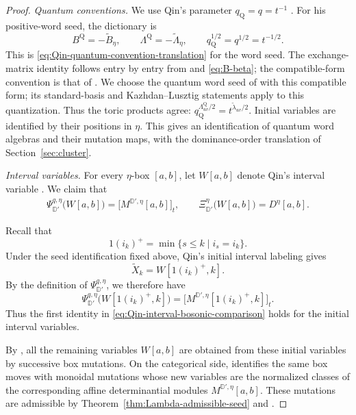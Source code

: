 \documentclass[12pt, reqno]{amsart}
\theoremstyle{plain}
\theoremstyle{definition}
\numberwithin{equation}{section}
\newcommand{\DD}{\mathbb{D}}
\begin{document}
\begin{proof}
\noindent\emph{Quantum conventions.}
We use Qin's parameter \(q_{\mathrm Q}=q=t^{-1}\)
\cite{qin2024analogs}. For his positive-word seed, the dictionary is
\begin{equation}\label{eq:Qin-word-quantum-dictionary}
 B^{\mathrm Q}=-\widetilde B_\eta,
 \qquad
 \Lambda^{\mathrm Q}=-\widetilde\Lambda_\eta,
 \qquad q_{\mathrm Q}^{1/2}=q^{1/2}=t^{-1/2}.
\end{equation}
This is \eqref{eq:Qin-quantum-convention-translation} for the word
seed.  The exchange-matrix identity follows entry by entry from
\cite[Lemma~6.3]{qin2024analogs} and \eqref{eq:B-beta}; the
compatible-form convention is that of
\cite[Section~4.1]{qin2024analogs}.  We choose the quantum word
seed of \cite[Section~6.2]{qin2024analogs} with this compatible
form; its standard-basis and Kazhdan--Lusztig statements apply to
this quantization.  Thus the toric products agree:
\(q_{\mathrm Q}^{\Lambda^{\mathrm Q}_{uv}/2}
 =t^{\widetilde\lambda_{uv}/2}\).
Initial variables are identified by their positions in \(\eta\).
This gives an identification of quantum word algebras and their
mutation maps, with the dominance-order translation of
Section~\ref{sec:cluster}.

\smallskip
\noindent\emph{Interval variables.}
For every \(\eta\)-box \([a,b]\), let \(W[a,b]\) denote Qin's
interval variable \cite[Definition~8.3]{qin2024analogs}. We claim
that
\begin{equation}\label{eq:Qin-interval-bosonic-comparison}
\begin{aligned}
    \Psi_{\DD'}^{q,\eta}\bigl(W[a,b]\bigr)
    =
    \bigl[M^{\DD',\eta}[a,b]\bigr]_t,\qquad
    \Xi_{\DD'}^\eta\bigl(W[a,b]\bigr)
    =
    D^\eta[a,b].
\end{aligned}
\end{equation}

Recall that
\[
    1(i_k)^+
    =
    \min\{s\leq k\mid i_s=i_k\}.
\]
Under the seed identification fixed above, Qin's initial interval
labeling gives
\[
    \widetilde X_k
    =
    W[1(i_k)^+,k].
\]
By the definition of
\(\Psi_{\DD'}^{q,\eta}\), we therefore have
\[
    \Psi_{\DD'}^{q,\eta}
       \bigl(W[1(i_k)^+,k]\bigr)
    =
    \bigl[
       M^{\DD',\eta}[1(i_k)^+,k]
    \bigr]_t.
\]
Thus the first identity in
\eqref{eq:Qin-interval-bosonic-comparison} holds for the initial
interval variables.

By
\cite[Definition~8.3 and Proposition~8.6]{qin2024analogs},
all the remaining variables \(W[a,b]\) are obtained from these
initial variables by successive box mutations. On the categorical
side, \cite[Lemma~8.12]{kashiwara2025monoidal} identifies the same
box moves with monoidal mutations whose new variables are the
normalized classes of the corresponding affine determinantial
modules \(M^{\DD',\eta}[a,b]\). These mutations are admissible by
Theorem~\ref{thm:Lambda-admissible-seed} and
\cite[Corollary~8.13]{kashiwara2025monoidal}.


\end{proof}
\end{document}
